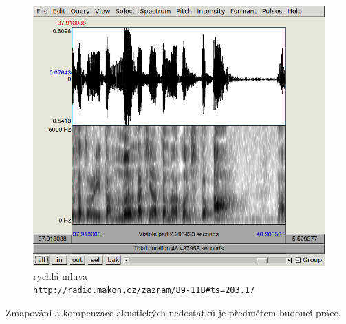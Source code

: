 \begin{figure}[htpb]
\includegraphics[scale=0.89]{rc/spectrum-rychla-mluva-89-11B.png}
\caption{
    rychlá mluva\\
    \texttt{http://radio.makon.cz/zaznam/89-11B\#ts=203.17}
}
\label{fig:spectr-fasttalk}
\end{figure}

Zmapování a kompenzace akustických nedostatků je předmětem budoucí práce.
